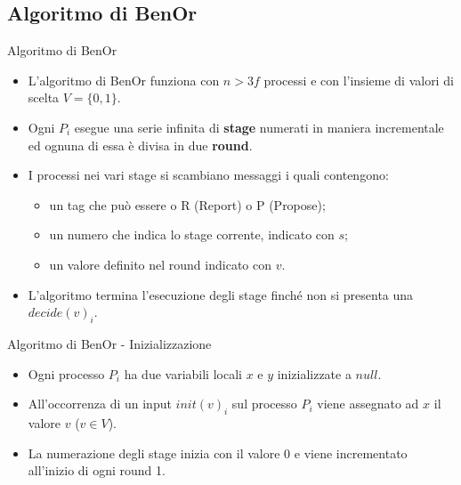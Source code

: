 \documentclass{beamer}
\begin{document}
\subsection{Algoritmo di BenOr}
\begin{frame}{Algoritmo di BenOr}
    \begin{itemize}
        \item L'algoritmo di BenOr funziona con $n > 3f$ processi e con l'insieme di valori di scelta $V = \{0, 1\}$.

        \item Ogni $P_{i}$ esegue una serie infinita di \textbf{stage} numerati in maniera incrementale ed ognuna di essa è divisa in due \textbf{round}.

        \item I processi nei vari stage si scambiano messaggi i quali contengono:
            \begin{itemize}
                \item un tag che può essere o R (Report) o P (Propose);
                \item un numero che indica lo stage corrente, indicato con $s$;
                \item un valore definito nel round indicato con $v$.
            \end{itemize}

        \item L'algoritmo termina l'esecuzione degli stage finché non si presenta una $decide(v)_{i}$.
    \end{itemize}
\end{frame}

\begin{frame}{Algoritmo di BenOr - Inizializzazione}
    \begin{itemize}
        \item Ogni processo $P_{i}$ ha due variabili locali $x$ e $y$ inizializzate a $null$.

        \item All'occorrenza di un input $init(v)_{i}$ sul processo $P_{i}$ viene assegnato ad $x$ il valore $v$ ($v \in V$).

        \item La numerazione degli stage inizia con il valore 0 e viene incrementato all'inizio di ogni round 1.
    \end{itemize}
\end{frame}
\end{document}
